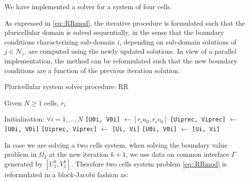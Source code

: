 We have implemented a solver for a system of four cells.

As expressed in \eqref{eq::RRmod}, the iterative procedure is formulated such that the pluricellular domain is solved sequentially, in the sense that the boundary conditions characterizing sub-domain $i$, depending on sub-domain solutions of $j \in \mathcal{N}_i$, are computed using the newly updated solutions. In view of a parallel implementation, the method can be reformulated such that the new boundary conditions are a function of the previous iteration solution.

\begin{algorithm}[t]
    \caption{Pluricellular system solver procedure: RR}
    \label{alg:RRmod}
    Given $N \geq 1$ cells, $r_i$
    \begin{algorithmic}[1]
    \STATE Initialization: $\forall i = 1, ..., N$
    \STATE \verb|[U0i, V0i]| $\gets [r_i u_0, r_i v_0]$
    \STATE \verb|[Uiprec, Viprec]| $\gets$  \verb|[U0i, V0i]|
    \STATE \verb|[Uiprec, Viprec]| $\gets$  \verb|[Ui, Vi]|
    \ENDFOR
    \STATE \verb|[U0i, V0i]| $\gets$  \verb|[Ui, Vi]|
    \ENDWHILE
    \end{algorithmic}
\end{algorithm}
In case we are solving a two cells system, when solving the boundary value problem in $\Omega_2$ at the new iteration $k+1$, we use data on common interface $\Gamma$ generated by $[U_1^k, V_1^k]$. Therefore two cells system problem \eqref{eq::RRmod} is reformulated in a block-Jacobi fashion as:

